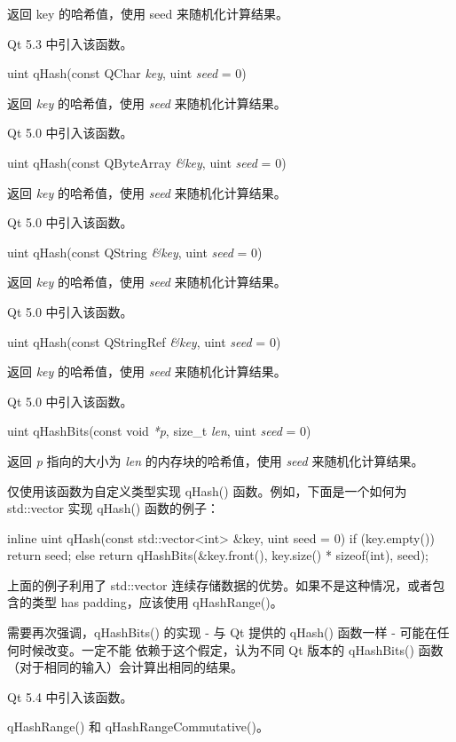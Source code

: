 返回 key 的哈希值，使用 seed 来随机化计算结果。

Qt 5.3 中引入该函数。

uint qHash(const QChar \emph{key}, uint \emph{seed} = 0)

返回 \emph{key} 的哈希值，使用 \emph{seed} 来随机化计算结果。

Qt 5.0 中引入该函数。

uint qHash(const QByteArray \emph{\&key},  uint \emph{seed} = 0)

返回 \emph{key} 的哈希值，使用 \emph{seed} 来随机化计算结果。

Qt 5.0 中引入该函数。

uint qHash(const QString \emph{\&key}, uint \emph{seed} = 0)

返回 \emph{key} 的哈希值，使用 \emph{seed} 来随机化计算结果。

Qt 5.0 中引入该函数。

uint qHash(const QStringRef \emph{\&key}, uint \emph{seed} = 0)

返回 \emph{key} 的哈希值，使用 \emph{seed} 来随机化计算结果。

Qt 5.0 中引入该函数。

uint qHashBits(const void \emph{*p}, size\_t \emph{len}, uint \emph{seed} = 0)

返回 \emph{p} 指向的大小为 \emph{len} 的内存块的哈希值，使用 \emph{seed} 来随机化计算结果。

仅使用该函数为自定义类型实现 qHash() 函数。例如，下面是一个如何为 std::vector 实现 qHash() 函数的例子：


\begin{cppcode}
inline uint qHash(const std::vector<int> &key, uint seed = 0)
{
    if (key.empty())
        return seed;
    else
        return qHashBits(&key.front(), key.size() * sizeof(int), seed);
}
\end{cppcode}

上面的例子利用了 std::vector 连续存储数据的优势。如果不是这种情况，或者包含的类型 has padding，应该使用 qHashRange()。

需要再次强调，qHashBits() 的实现 - 与 Qt 提供的 qHash() 函数一样 - 可能在任何时候改变。一定不能 依赖于这个假定，认为不同 Qt 版本的 qHashBits() 函数（对于相同的输入）会计算出相同的结果。

Qt 5.4 中引入该函数。


\begin{seeAlso}
qHashRange() 和 qHashRangeCommutative()。
\end{seeAlso}

